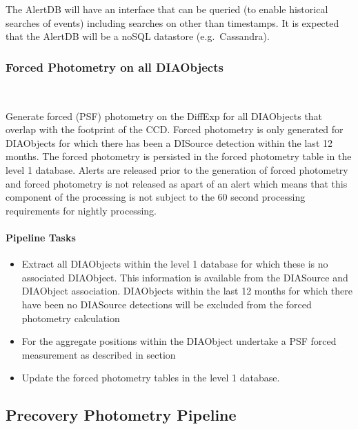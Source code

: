 The AlertDB will have an interface that can be queried (to enable historical searches of events) including searches on other than timestamps. It is expected that the AlertDB will be a noSQL datastore (e.g.\ Cassandra).



\subsubsection{Forced Photometry on all DIAObjects}~

Generate forced (PSF) photometry on the DiffExp for all DIAObjects that overlap with the footprint of the CCD. Forced photometry is only generated for DIAObjects for which there has been a DISource detection within the last 12 months. The forced photometry is persisted in the forced photometry table in the level 1 database. Alerts are released prior to the generation of forced photometry and forced photometry is not released as apart of an alert which means that this component of the processing is not subject to the 60 second processing requirements for nightly processing.

\paragraph{Pipeline Tasks}

\begin{itemize}
\item Extract all DIAObjects within the level 1 database for which these is no associated DIAObject. This information is available from the DIASource and DIAObject association.  DIAObjects within the last 12 months for which there have been no DIASource detections will be excluded from the forced photometry calculation
\item For the aggregate positions within the DIAObject undertake a PSF forced measurement as described in section \hyperref[sec:acForcedMeasurement]{}
\item Update the forced photometry tables in the level 1 database.
\end{itemize}



\clearpage

\subsection{Precovery Photometry Pipeline}

